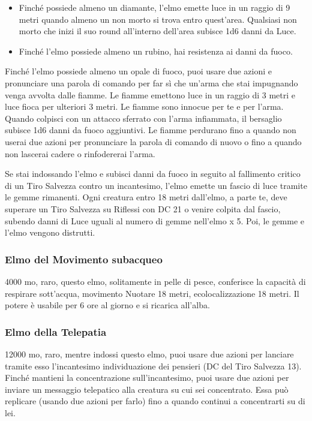 \begin{multicols}{2}
\begin{itemize}
		\item
		Finché possiede almeno un diamante, l'elmo emette luce in un raggio di 9 metri quando almeno un non morto si trova entro quest'area. Qualsiasi non morto che inizi il suo round all'interno dell'area subisce 1d6 danni da Luce.

		\item
		Finché l'elmo possiede almeno un rubino, hai resistenza ai danni da fuoco.
	\end{itemize}

	\medskip

	Finché l'elmo possiede almeno un opale di fuoco, puoi usare due azioni e pronunciare una parola di comando per far sì che un'arma che stai impugnando venga avvolta dalle fiamme. Le fiamme emettono luce in un raggio di 3 metri e luce fioca per ulteriori 3 metri. Le fiamme sono innocue per te e per l'arma. Quando colpisci con un attacco sferrato con l'arma infiammata, il bersaglio subisce 1d6 danni da fuoco aggiuntivi. Le fiamme perdurano fino a quando non userai due azioni per pronunciare la parola di comando di nuovo o fino a quando non lascerai cadere o rinfodererai l'arma.

	Se stai indossando l'elmo e subisci danni da fuoco in seguito al fallimento critico di un Tiro Salvezza contro un incantesimo, l'elmo emette un fascio di luce tramite le gemme rimanenti. Ogni creatura entro 18 metri dall'elmo, a parte te, deve superare un Tiro Salvezza su Riflessi con DC 21 o venire colpita dal fascio, subendo danni di Luce uguali al numero di gemme nell'elmo x 5. Poi, le gemme e l'elmo vengono distrutti.

	\subsubsection*{Elmo del Movimento subacqueo}
	4000 mo, raro, questo elmo, solitamente in pelle di pesce, conferisce la capacità di respirare sott'acqua, movimento Nuotare 18 metri, ecolocalizzazione 18 metri. Il potere è usabile per 6 ore al giorno e si ricarica all'alba.

	\subsubsection*{Elmo della Telepatia}
	12000 mo, raro, mentre indossi questo elmo, puoi usare due azioni per lanciare tramite esso l'incantesimo individuazione dei pensieri (DC del Tiro Salvezza 13). Finché mantieni la concentrazione sull'incantesimo, puoi usare due azioni per inviare un messaggio telepatico alla creatura su cui sei concentrato. Essa può replicare (usando due azioni per farlo) fino a quando continui a concentrarti su di lei.


\end{multicols}
